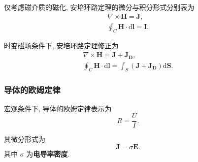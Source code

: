 仅考虑磁介质的磁化, 安培环路定理的微分与积分形式分别表为
\begin{gather}
    \nabla\times\bm{H}=\bm{J}, \\
    \oint_C\bm{H}\cdot\mathrm{d}\bm{l}=\bm{I}.
\end{gather}

时变磁场条件下, 安培环路定理修正为
\begin{gather}
    \nabla\times\bm{H}=\bm{J}+\bm{J_D}, \label{eq:2.5 nabla times H} \\
    \oint_C\bm{H}\cdot\mathrm{d}\bm{l}=\int_S(\bm{J}+\bm{J_D})\mathrm{d}\bm{S}.
\end{gather}

\subsubsection{导体的欧姆定律}
宏观条件下, 导体的欧姆定律表示为
\begin{equation}
    R=\frac{U}{I}.
\end{equation}

其微分形式为
\begin{equation}
    \bm{J}=\sigma\bm{E}.
\end{equation}
其中 $\sigma$ 为\textbf{电导率密度}.

